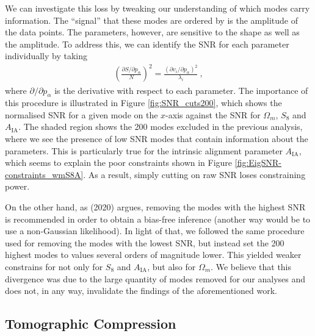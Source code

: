 \documentclass[twocolumn,nofootinbib]{\docclass}
\newcommand{\rf}[1]{Figure \ref{fig:#1}}
\def\bea{\begin{eqnarray}}
\def\eea{\end{eqnarray}}
\begin{document}
	We can investigate this loss by tweaking our understanding of which modes carry information. The ``signal'' that these modes are ordered by is the amplitude of the data points.  The parameters, however, are sensitive to the shape as well as the amplitude.
	To address this, we can identify the SNR for each parameter individually by taking
	\bea
	\left(\frac{\partial S/\partial p_\alpha}{N}\right)^2 = \frac{(\partial v_i / \partial p_\alpha)^2}{\lambda_i}\
	,\eea
	where $\partial /\partial p_\alpha$ is the derivative with respect to each parameter. The importance of this procedure is illustrated in \rf{SNR_cuts200}, which shows the normalised SNR for a given mode on the $x$-axis against the SNR for $\Omega_m$, $S_8$ and $A_{\mathrm{IA}}$. The shaded region shows the 200 modes excluded in the previous analysis, where we see the presence of low SNR modes that contain information about the parameters. This is particularly true for the intrinsic alignment parameter $A_{\mathrm{IA}}$, which seems to explain the poor constraints shown in \rf{EigSNR-constraints_wmS8A}. As a result, simply cutting on raw SNR loses constraining power.
	
	On the other hand, as \citeauthor{Louca:2020} (2020) argues, removing the modes with the highest SNR is recommended in order to obtain a bias-free inference (another way would be to use a non-Gaussian likelihood). In light of that, we followed the same procedure used for removing the modes with the lowest SNR, but instead set the 200 highest modes to values several orders of magnitude lower. This yielded weaker constrains for not only for $S_8$ and $A_{\mathrm{IA}}$, but also for $\Omega_m$. We believe that this divergence was due to the large quantity of modes removed for our analyses and does not, in any way, invalidate the findings of the aforementioned work.
	
	
	\subsection{Tomographic Compression}
	\label{subsec:tomographic_compression}
	
\end{document}
